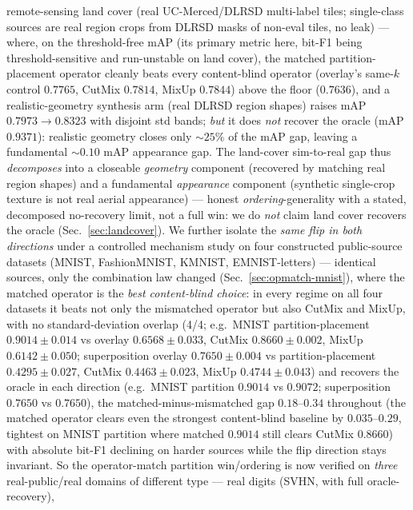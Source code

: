 \documentclass[11pt]{article}
\begin{document}
\begin{enumerate}
{  remote-sensing land cover (real UC-Merced/DLRSD multi-label tiles; single-class sources are
  real region crops from DLRSD masks of non-eval tiles, no leak) ---} where, on the
  threshold-free mAP (its primary metric here, bit-F1 being threshold-sensitive and
  run-unstable on land cover), the matched partition-placement operator cleanly beats every
  content-blind operator (overlay's same-$k$ control $0.7765$, CutMix $0.7814$, MixUp
  $0.7844$) above the floor ($0.7636$), and a realistic-geometry synthesis arm (real DLRSD
  region shapes) raises mAP $0.7973 \to 0.8323$ with disjoint std bands; \emph{but} it does
  \emph{not} recover the oracle (mAP $0.9371$): realistic geometry closes only ${\sim}25\%$ of
  the mAP gap, leaving a fundamental ${\sim}0.10$ mAP appearance gap. The land-cover
  sim-to-real gap thus \emph{decomposes} into a closeable \emph{geometry} component (recovered
  by matching real region shapes) and a fundamental \emph{appearance} component (synthetic
  single-crop texture is not real aerial appearance) --- honest \emph{ordering}-generality
  with a stated, decomposed no-recovery limit, not a full win: we do \emph{not} claim land
  cover recovers the oracle (Sec.~\ref{sec:landcover}). We further isolate the
  \emph{same flip in both directions} under a controlled mechanism study on four constructed
  public-source
  datasets (MNIST, FashionMNIST, KMNIST, EMNIST-letters) --- identical sources, only the
  combination law changed (Sec.~\ref{sec:opmatch-mnist}), where the matched operator is the
  \emph{best content-blind choice}: in every regime on all four datasets it beats not only
  the mismatched operator but
  also CutMix and MixUp, with no standard-deviation overlap (4/4; e.g.\ MNIST
  partition-placement $0.9014 \pm 0.014$ vs overlay $0.6568 \pm 0.033$, CutMix
  $0.8660 \pm 0.002$, MixUp $0.6142 \pm 0.050$; superposition overlay $0.7650 \pm 0.004$ vs
  partition-placement $0.4295 \pm 0.027$, CutMix $0.4463 \pm 0.023$, MixUp $0.4744 \pm 0.043$)
  and recovers the oracle in each direction (e.g.\ MNIST partition $0.9014$ vs $0.9072$;
  superposition $0.7650$ vs $0.7650$), the matched-minus-mismatched gap $0.18$--$0.34$
  throughout (the matched operator clears even the strongest content-blind baseline by
  $0.035$--$0.29$, tightest on MNIST partition where matched $0.9014$ still clears CutMix
  $0.8660$) with absolute bit-F1 declining on harder sources while the flip direction stays
  invariant. So the operator-match partition win/ordering is now verified on \emph{three}
  real-public/real domains of different type --- real digits (SVHN, with full oracle-recovery),

\end{enumerate}
\end{document}
